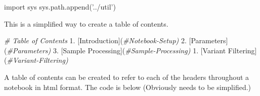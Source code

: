 \documentclass[]{book}
\newenvironment{Shaded}{\begin{snugshade}}{\end{snugshade}}
\newcommand{\CommentTok}[1]{\textcolor[rgb]{0.56,0.35,0.01}{\textit{#1}}}
\newcommand{\FloatTok}[1]{\textcolor[rgb]{0.00,0.00,0.81}{#1}}
\newcommand{\ImportTok}[1]{#1}
\newcommand{\NormalTok}[1]{#1}
\newcommand{\StringTok}[1]{\textcolor[rgb]{0.31,0.60,0.02}{#1}}
\begin{document}
\begin{Shaded}
\begin{Highlighting}[]
\ImportTok{import}\NormalTok{ sys}
\NormalTok{sys.path.append(}\StringTok{'../util'}\NormalTok{)}
\end{Highlighting}
\end{Shaded}

This is a simplified way to create a table of contents.

\begin{Shaded}
\begin{Highlighting}[]
\CommentTok{# Table of Contents}
\FloatTok{1.}\NormalTok{ [Introduction](}\CommentTok{#Notebook-Setup)}
\FloatTok{2.}\NormalTok{ [Parameters](}\CommentTok{#Parameters)}
\FloatTok{3.}\NormalTok{ [Sample Processing](}\CommentTok{#Sample-Processing)}
    \FloatTok{1.}\NormalTok{ [Variant Filtering](}\CommentTok{#Variant-Filtering)}
\end{Highlighting}
\end{Shaded}

A table of contents can be created to refer to each of the headers throughout a notebook in html format. The code is below (Obviously needs to be simplified.)
\end{document}
